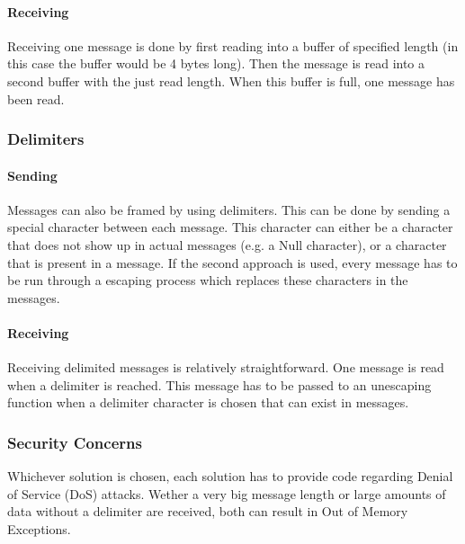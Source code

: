 \paragraph{Receiving}

Receiving one message is done by first reading into a buffer of specified length (in this case the buffer would be 4 bytes long). Then the message is read into a second buffer with the just read length. When this buffer is full, one message has been read.

\subsubsection{Delimiters}

\paragraph{Sending}

Messages can also be framed by using delimiters. This can be done by sending a special character between each message. This character can either be a character that does not show up in actual messages (e.g. a Null character), or a character that is present in a message. If the second approach is used, every message has to be run through a escaping process which replaces these characters in the messages.

\paragraph{Receiving}

Receiving delimited messages is relatively straightforward. One message is read when a delimiter is reached. This message has to be passed to an unescaping function when a delimiter character is chosen that can exist in messages.

\subsubsection{Security Concerns}

Whichever solution is chosen, each solution has to provide code regarding Denial of Service (DoS) attacks. Wether a very big message length or large amounts of data without a delimiter are received, both can result in Out of Memory Exceptions.
